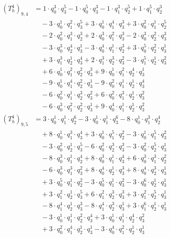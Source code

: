 \begin{align*}(T_{h}^4)_{9,4}&=1\cdot q_0^{3}\cdot q_3^{5}-1\cdot q_0^{5}\cdot q_3^{3}-1\cdot q_1^{3}\cdot q_2^{5}+1\cdot q_1^{5}\cdot q_2^{3}\\
&\quad -3\cdot q_0^{1}\cdot q_1^{2}\cdot q_3^{5}+3\cdot q_0^{1}\cdot q_1^{4}\cdot q_3^{3}+3\cdot q_0^{2}\cdot q_1^{1}\cdot q_2^{5}\\
&\quad -2\cdot q_0^{2}\cdot q_1^{3}\cdot q_2^{3}+2\cdot q_0^{3}\cdot q_1^{2}\cdot q_3^{3}-2\cdot q_0^{3}\cdot q_2^{2}\cdot q_3^{3}\\
&\quad -3\cdot q_0^{3}\cdot q_2^{4}\cdot q_3^{1}-3\cdot q_0^{4}\cdot q_1^{1}\cdot q_2^{3}+3\cdot q_0^{5}\cdot q_2^{2}\cdot q_3^{1}\\
&\quad +3\cdot q_1^{3}\cdot q_2^{1}\cdot q_3^{4}+2\cdot q_1^{3}\cdot q_2^{3}\cdot q_3^{2}-3\cdot q_1^{5}\cdot q_2^{1}\cdot q_3^{2}\\
&\quad +6\cdot q_0^{1}\cdot q_1^{2}\cdot q_2^{2}\cdot q_3^{3}+9\cdot q_0^{1}\cdot q_1^{2}\cdot q_2^{4}\cdot q_3^{1}\\
&\quad -9\cdot q_0^{1}\cdot q_1^{4}\cdot q_2^{2}\cdot q_3^{1}-9\cdot q_0^{2}\cdot q_1^{1}\cdot q_2^{1}\cdot q_3^{4}\\
&\quad -6\cdot q_0^{2}\cdot q_1^{1}\cdot q_2^{3}\cdot q_3^{2}+6\cdot q_0^{2}\cdot q_1^{3}\cdot q_2^{1}\cdot q_3^{2}\\
&\quad -6\cdot q_0^{3}\cdot q_1^{2}\cdot q_2^{2}\cdot q_3^{1}+9\cdot q_0^{4}\cdot q_1^{1}\cdot q_2^{1}\cdot q_3^{2}\end{align*}
\begin{align*}(T_{h}^4)_{9,5}&=3\cdot q_0^{1}\cdot q_1^{1}\cdot q_2^{6}-3\cdot q_0^{1}\cdot q_1^{1}\cdot q_3^{6}-8\cdot q_0^{1}\cdot q_1^{3}\cdot q_2^{4}\\
&\quad +8\cdot q_0^{1}\cdot q_1^{3}\cdot q_3^{4}+3\cdot q_0^{1}\cdot q_1^{5}\cdot q_2^{2}-3\cdot q_0^{1}\cdot q_1^{5}\cdot q_3^{2}\\
&\quad -3\cdot q_0^{2}\cdot q_2^{1}\cdot q_3^{5}-6\cdot q_0^{2}\cdot q_2^{3}\cdot q_3^{3}-3\cdot q_0^{2}\cdot q_2^{5}\cdot q_3^{1}\\
&\quad -8\cdot q_0^{3}\cdot q_1^{1}\cdot q_2^{4}+8\cdot q_0^{3}\cdot q_1^{1}\cdot q_3^{4}+6\cdot q_0^{3}\cdot q_1^{3}\cdot q_2^{2}\\
&\quad -6\cdot q_0^{3}\cdot q_1^{3}\cdot q_3^{2}+8\cdot q_0^{4}\cdot q_2^{1}\cdot q_3^{3}+8\cdot q_0^{4}\cdot q_2^{3}\cdot q_3^{1}\\
&\quad +3\cdot q_0^{5}\cdot q_1^{1}\cdot q_2^{2}-3\cdot q_0^{5}\cdot q_1^{1}\cdot q_3^{2}-3\cdot q_0^{6}\cdot q_2^{1}\cdot q_3^{1}\\
&\quad +3\cdot q_1^{2}\cdot q_2^{1}\cdot q_3^{5}+6\cdot q_1^{2}\cdot q_2^{3}\cdot q_3^{3}+3\cdot q_1^{2}\cdot q_2^{5}\cdot q_3^{1}\\
&\quad -8\cdot q_1^{4}\cdot q_2^{1}\cdot q_3^{3}-8\cdot q_1^{4}\cdot q_2^{3}\cdot q_3^{1}+3\cdot q_1^{6}\cdot q_2^{1}\cdot q_3^{1}\\
&\quad -3\cdot q_0^{1}\cdot q_1^{1}\cdot q_2^{2}\cdot q_3^{4}+3\cdot q_0^{1}\cdot q_1^{1}\cdot q_2^{4}\cdot q_3^{2}\\
&\quad +3\cdot q_0^{2}\cdot q_1^{4}\cdot q_2^{1}\cdot q_3^{1}-3\cdot q_0^{4}\cdot q_1^{2}\cdot q_2^{1}\cdot q_3^{1}\end{align*}

